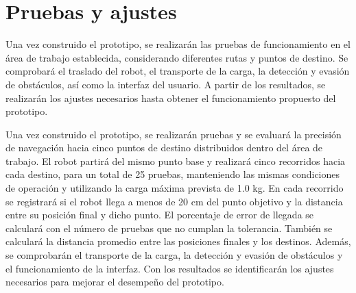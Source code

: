 \section{Pruebas y ajustes}
\label{sec:Pruebas_Ajustes}

Una vez construido el prototipo, se realizarán las pruebas de funcionamiento en el área de trabajo establecida, considerando diferentes rutas y puntos de destino. Se comprobará el traslado del robot, el transporte de la carga, la detección y evasión de obstáculos, así como la interfaz del usuario. A partir de los resultados, se realizarán los ajustes necesarios hasta obtener el funcionamiento propuesto del prototipo.


Una vez construido el prototipo, se realizarán pruebas y se evaluará la precisión de navegación hacia cinco puntos de destino distribuidos dentro del área de trabajo. El robot partirá del mismo punto base y realizará cinco recorridos hacia cada destino, para un total de 25 pruebas, manteniendo las mismas condiciones de operación y utilizando la carga máxima prevista de 1.0 kg. En cada recorrido se registrará si el robot llega a menos de 20 cm del punto objetivo y la distancia entre su posición final y dicho punto. El porcentaje de error de llegada se calculará con el número de pruebas que no cumplan la tolerancia. También se calculará la distancia promedio entre las posiciones finales y los destinos. Además, se comprobarán el transporte de la carga, la detección y evasión de obstáculos y el funcionamiento de la interfaz. Con los resultados se identificarán los ajustes necesarios para mejorar el desempeño del prototipo.

